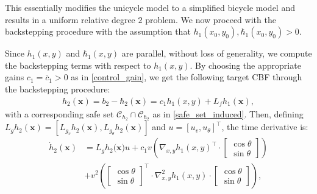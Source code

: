 \documentclass[letterpaper, 10 pt, conference]{ieeeconf}
\begin{document}
This essentially modifies the unicycle model to a simplified bicycle model \cite{rahman_driver_2021} and results in a uniform relative degree $2$ problem. We now proceed with the backstepping procedure with the assumption that $h_1(x_0,y_0),\hbar_1(x_0,y_0)>0$.

Since $h_1(x,y)$ and $\hbar_1(x,y)$ are parallel, without loss of generality, we compute the backstepping terms with respect to $h_1(x,y)$. 
By choosing the appropriate gains $c_1 = \overline{c}_1 > 0$ as in \eqref{control_gain}, we get the following target CBF through the backstepping procedure:
\begin{align}
    h_2(\mathbf{x}) = b_2 - \hbar_2(\mathbf{x}) = c_1h_1(x,y) + L_fh_1(\mathbf{x})\label{h2},
\end{align}
with a corresponding safe set $\mathcal{C}_{h_2}\cap\mathcal{C}_{\hbar_2}$ as in \eqref{safe_set_induced}. Then, defining $L_gh_2(\mathbf{x}) = [L_{g_v}h_2(\mathbf{x}),L_{g_\theta}h_2(\mathbf{x})]$ and $u = [u_v,u_\theta]^\top$, the time derivative is:
\begin{align}
    \dot{h}_2(\mathbf{x}) 
    &= L_gh_2(\mathbf{x)}u + c_1v\left(\nabla_{x,y} h_1(x,y)^\top \cdot\begin{bmatrix}
        \cos\theta\\
        \sin\theta
    \end{bmatrix}\right)\nonumber\\
    &+  v^2\left(
    \begin{bmatrix}
        \cos\theta\\
        \sin\theta
    \end{bmatrix}^\top
    \cdot\nabla^2_{x,y} h_1(x,y) \cdot 
    \begin{bmatrix}
        \cos\theta\\
        \sin\theta
    \end{bmatrix}\right)\label{h2_dot_uni},
\end{align}
\end{document}
